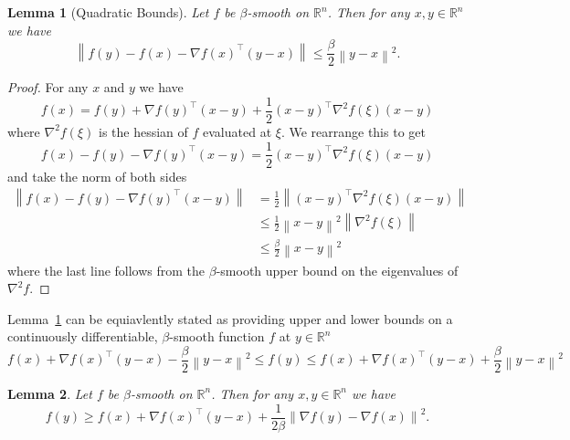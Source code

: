 \documentclass{article}
\newcommand{\R}{\mathbb R}
\newcommand{\norm}[1]{\left\| #1 \right\| }
\newtheorem{lemma}{Lemma}
\theoremstyle{definition}
\begin{document}
\begin{lemma}[Quadratic Bounds]
    \label{lem:quadratic_bounds}
    Let $f$ be $\beta$-smooth on $\R^n$. Then for any $x, y \in \R^n$ we have 
    \begin{equation}
        \norm{f(y) - f(x) - \nabla {f(x)}^\intercal(y - x)} \leq \frac{\beta}{2}
        \norm{y - x}^2.
    \end{equation}
\end{lemma}

\begin{proof}
    For any $x$ and $y$ we have
    \begin{equation}
        f(x) = f(y) + \nabla {f(y)}^\intercal (x - y) + \frac{1}{2} {(x -
        y)}^\intercal \nabla^2 f(\xi) (x - y)
    \end{equation}
    where $\nabla^2 f(\xi)$ is the hessian of $f$ evaluated at $\xi$. We
    rearrange this to get 
    \begin{equation}
        f(x) - f(y) - \nabla {f(y)}^\intercal (x - y) = \frac{1}{2} {(x -
        y)}^\intercal \nabla^2 f(\xi) (x - y)
    \end{equation}
    and take the norm of both sides
    \begin{equation}
        \begin{aligned}
            \norm{f(x) - f(y) - \nabla {f(y)}^\intercal (x - y)} &= \frac{1}{2}
            \norm{{(x - y)}^\intercal \nabla^2 f(\xi) (x - y)} \\ 
            &\leq \frac{1}{2}
            \norm{x - y}^2 \norm{\nabla^2 f(\xi)} \\
            &\leq \frac{\beta}{2}
            \norm{x - y}^2 
        \end{aligned}
    \end{equation}
    where the last line follows from the $\beta$-smooth upper bound on the
    eigenvalues of $\nabla^2 f$.
\end{proof}

Lemma~\ref{lem:quadratic_bounds} can be equiavlently stated as providing upper
and lower bounds on a continuously differentiable, $\beta$-smooth function $f$
at $y \in \R^n$
\begin{equation}
    f(x) + \nabla {f(x)}^\intercal(y - x) - \frac{\beta}{2} \norm{y - x}^2 \leq
    f(y) \leq
    f(x) + \nabla {f(x)}^\intercal(y - x) + \frac{\beta}{2} \norm{y - x}^2
\end{equation}

\begin{lemma}
    Let $f$ be $\beta$-smooth on $\R^n$. Then for any $x, y \in \R^n$ we have
    \begin{equation}
        f(y) \geq f(x) + \nabla {f(x)}^\intercal(y - x) + \frac{1}{2
        \beta}\norm{\nabla f(y) - \nabla f(x)}^2.
    \end{equation}
\end{lemma}





\end{document}
